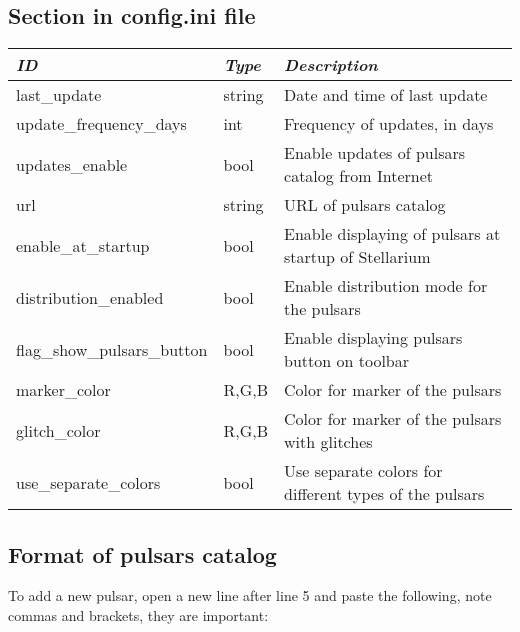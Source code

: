 \subsection{Section  in config.ini file}
\label{sec:plugins:Pulsars:config}

\begin{longtabu} to \textwidth {l|l|X}\toprule
\emph{ID}               & \emph{Type} & \emph{Description}\\\midrule
last\_update                & string & Date and time of last update\\\midrule
update\_frequency\_days     & int    & Frequency of updates, in days\\\midrule
updates\_enable             & bool   & Enable updates of pulsars catalog from Internet \\\midrule
url                         & string & URL of pulsars catalog \\\midrule
enable\_at\_startup         & bool   & Enable displaying of pulsars at startup of Stellarium \\\midrule
distribution\_enabled       & bool   & Enable distribution mode for the pulsars \\\midrule
flag\_show\_pulsars\_button & bool   & Enable displaying pulsars button on toolbar \\\midrule
marker\_color               & R,G,B  & Color for marker of the pulsars \\\midrule
glitch\_color               & R,G,B  & Color for marker of the pulsars with glitches \\\midrule
use\_separate\_colors       & bool   & Use separate colors for different types of the pulsars \\\bottomrule
\end{longtabu}

\subsection{Format of pulsars catalog}
\label{sec:plugins:Pulsars:format}

To add a new pulsar, open a new line after line 5 and paste the following, note commas and brackets, they are important:


